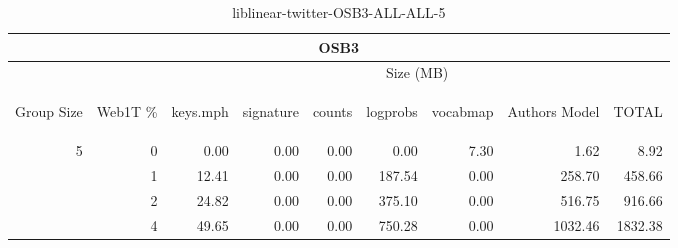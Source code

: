 \begin{center}
\begin{table}[htbp]
\begin{tabular}{ | r | r | r | r | r | r | r | r | r |}
\hline
\multicolumn{9}{|c|}{OSB3}\\
\hline
 & & \multicolumn{7}{|c|}{Size (MB)}\\ \cline{3-9}
\begin{sideways}Group Size\end{sideways} & \begin{sideways}Web1T \% \end{sideways} & \begin{sideways}keys.mph\end{sideways} & \begin{sideways}signature\end{sideways} & \begin{sideways}counts\end{sideways} & \begin{sideways}logprobs\end{sideways} & \begin{sideways}vocabmap\end{sideways} & \begin{sideways}Authors Model \end{sideways} & \begin{sideways}TOTAL\end{sideways}\\
\hline
\multirow{3}{*}{5}
 & 0 & 0.00 & 0.00 & 0.00 & 0.00 & 7.30 & 1.62 & 8.92\\ \cline{2-9}
 & 1 & 12.41 & 0.00 & 0.00 & 187.54 & 0.00 & 258.70 & 458.66\\ \cline{2-9}
 & 2 & 24.82 & 0.00 & 0.00 & 375.10 & 0.00 & 516.75 & 916.66\\ \cline{2-9}
 & 4 & 49.65 & 0.00 & 0.00 & 750.28 & 0.00 & 1032.46 & 1832.38\\ \cline{2-9}
\hline
\end{tabular}
\caption{liblinear-twitter-OSB3-ALL-ALL-5}
\label{table:liblinear-twitter-OSB3-ALL-ALL-5}
\end{table}
\end{center}

